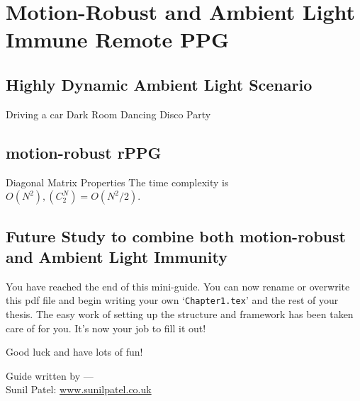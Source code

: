 \chapter{Motion-Robust and Ambient Light Immune Remote PPG} %

\label{Chapter8} %


\section{Highly Dynamic Ambient Light Scenario}
Driving a car
Dark Room
Dancing Disco Party

\section{motion-robust rPPG}

\begin{compactitem}

\item Diagonal Matrix Properties
The time complexity is $O(N^2),  (C_2^N) = O(N^2/2)$.
\end{compactitem}

\section{Future Study to combine both motion-robust and Ambient Light Immunity}

You have reached the end of this mini-guide. You can now rename or overwrite this pdf file and begin writing your own `\texttt{Chapter1.tex}' and the rest of your thesis. The easy work of setting up the structure and framework has been taken care of for you. It's now your job to fill it out!

Good luck and have lots of fun!

\begin{flushright}
Guide written by ---\\
Sunil Patel: \href{http://www.sunilpatel.co.uk}{www.sunilpatel.co.uk}
\end{flushright}
